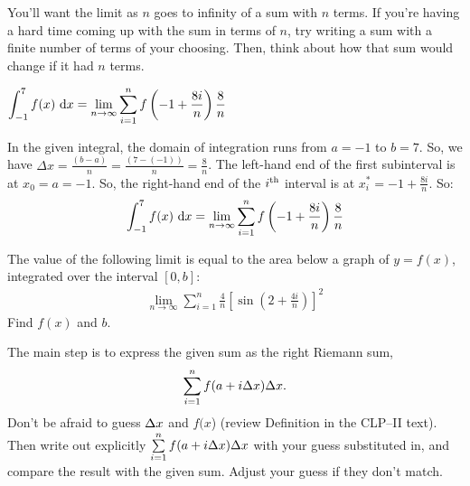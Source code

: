 \begin{hint}
You'll want the limit as $n$ goes to infinity of a sum with $n$ terms. If you're having a hard time coming up with the sum in terms of $n$, try writing a sum with a finite number of terms of your choosing. Then, think about how that sum would change if it had $n$ terms.
\end{hint}

\begin{answer}
$\displaystyle\int_{-1}^{7}f(x)\,\,\mathrm{d}x=\displaystyle\lim_{n\to\infty}\displaystyle\sum_{i=1}^{n} f\left(-1+\frac{8i}{n}\right)\frac{8}{n}$
\end{answer}

\begin{solution}
In the given integral, the domain of integration runs from $a=-1$ to $b=7$.
So, we have $\Delta x = \frac{(b-a)}{n}= \frac{(7-(-1))}{n} = \frac{8}{n}$. The left-hand end of the first
subinterval is at $x_0=a=-1$. So, the right-hand end of the $i^{\rm th}$ interval
is at $x_i^* = -1+\frac{8i}{n}$. So:
\begin{align*}
\int_{-1}^{7}f(x)\,\,\mathrm{d}x
=\lim_{n\to\infty}\sum_{i=1}^{n} f\left(-1+\frac{8i}{n}\right)\frac{8}{n}
\end{align*}

\end{solution}

\begin{question}[2016Q1]
The value of the following limit is equal to the area below a graph of $y=f(x)$, integrated over the interval $[0,b]$:
\begin{align*}
   \lim_{n \to \infty} \sum_{i=1}^{n} \frac{4}{n}
          \left[ \sin \left( 2 + \frac{4i}{n}\right)\right]^2
\end{align*}
Find $f(x)$ and $b$.
\end{question}

\begin{hint}
The main step is to express the given sum as the right Riemann sum,
\[\sum_{i=1}^{n} f(a+i\Delta x)\Delta  x.\]
Don't be afraid to guess $\Delta x$ and $f(x$)
(review Definition   in the
CLP--II text).
Then write out explicitly $ \sum\limits_{i=1}^{n} f(a+i\Delta x)\Delta  x$
with your guess substituted in, and compare the result with the given sum.  Adjust your guess if they don't match.
\end{hint}

